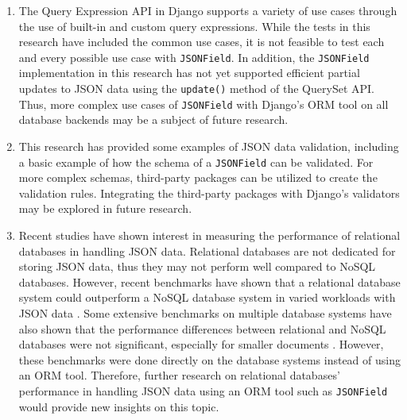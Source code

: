 \begin{enumerate}
	\item The Query Expression API in Django supports a variety of use cases
		  through the use of built-in and custom query expressions. While the
		  tests in this research have included the common use cases, it is not
		  feasible to test each and every possible use case with
		  \verb|JSONField|. In addition, the \verb|JSONField| implementation in
		  this research has not yet supported efficient partial updates to JSON
		  data using the \verb|update()| method of the QuerySet API. Thus, more
		  complex use cases of \verb|JSONField| with Django's ORM tool on all
		  database backends may be a subject of future research.
	\item This research has provided some examples of JSON data validation,
		  including a basic example of how the schema of a \verb|JSONField| can
		  be validated. For more complex schemas, third-party packages can be
		  utilized to create the validation rules. Integrating the third-party
		  packages with Django's validators may be explored in future
		  research.
	\item Recent studies have shown interest in measuring the performance of
		  relational databases in handling JSON data. Relational databases are
		  not dedicated for storing JSON data, thus they may not perform well
		  compared to NoSQL databases. However, recent benchmarks have shown
		  that a relational database system could outperform a NoSQL database
		  system in varied workloads with JSON data
		  \cite{enterprisedb_benchmark}. Some extensive benchmarks on multiple
		  database systems have also shown that the performance differences
		  between relational and NoSQL databases were not significant,
		  especially for smaller documents \cite{dolgov_benchmark}. However,
		  these benchmarks were done directly on the database systems instead
		  of using an ORM tool. Therefore, further research on relational
		  databases' performance in handling JSON data using an ORM tool such
		  as \verb|JSONField| would provide new insights on this topic.
\end{enumerate}

